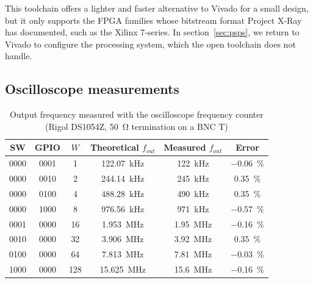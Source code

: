 \documentclass[11pt,a4paper]{article}
\renewcommand{\_}{\oldunderscore\allowbreak}
\begin{document}
This toolchain offers a lighter and faster alternative to Vivado for a small design,
but it only supports the FPGA families whose bitstream format Project X-Ray has
documented, such as the Xilinx 7-series. In section~\ref{sec:psps}, we return to
Vivado to configure the processing system, which the open toolchain does not handle.

\subsection{Oscilloscope measurements}

\begin{table}[H]
\centering
\begin{tabular}{cccccc}
\toprule
SW & GPIO & $W$ & Theoretical $f_{out}$ & Measured $f_{out}$ & Error \\
\midrule
0000 & 0001 & 1   & \SI{122.07}{\kilo\hertz} & \SI{122}{\kilo\hertz}  & \SI{-0.06}{\percent} \\
0000 & 0010 & 2   & \SI{244.14}{\kilo\hertz} & \SI{245}{\kilo\hertz}  & \SI{+0.35}{\percent} \\
0000 & 0100 & 4   & \SI{488.28}{\kilo\hertz} & \SI{490}{\kilo\hertz}  & \SI{+0.35}{\percent} \\
0000 & 1000 & 8   & \SI{976.56}{\kilo\hertz} & \SI{971}{\kilo\hertz}  & \SI{-0.57}{\percent} \\
0001 & 0000 & 16  & \SI{1.953}{\mega\hertz}  & \SI{1.95}{\mega\hertz} & \SI{-0.16}{\percent} \\
0010 & 0000 & 32  & \SI{3.906}{\mega\hertz}  & \SI{3.92}{\mega\hertz} & \SI{+0.35}{\percent} \\
0100 & 0000 & 64  & \SI{7.813}{\mega\hertz}  & \SI{7.81}{\mega\hertz} & \SI{-0.03}{\percent} \\
1000 & 0000 & 128 & \SI{15.625}{\mega\hertz} & \SI{15.6}{\mega\hertz} & \SI{-0.16}{\percent} \\
\bottomrule
\end{tabular}
\caption{Output frequency measured with the oscilloscope frequency counter
(Rigol DS1054Z, \SI{50}{\ohm} termination on a BNC T)}\label{tab:oscillo}
\end{table}
\end{document}
